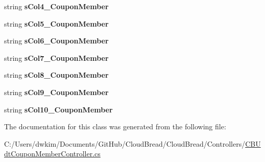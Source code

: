 \begin{DoxyCompactItemize}
\item 
string {\bfseries s\+Col4\+\_\+\+Coupon\+Member}\hypertarget{a00107_a351273da4a131cab3b9dfbbcc7a6a225}{}\label{a00107_a351273da4a131cab3b9dfbbcc7a6a225}

\item 
string {\bfseries s\+Col5\+\_\+\+Coupon\+Member}\hypertarget{a00107_a97416d9aeddf0f3162d7312692d5e01c}{}\label{a00107_a97416d9aeddf0f3162d7312692d5e01c}

\item 
string {\bfseries s\+Col6\+\_\+\+Coupon\+Member}\hypertarget{a00107_a26ceb53b70f63f0c74d13090583af721}{}\label{a00107_a26ceb53b70f63f0c74d13090583af721}

\item 
string {\bfseries s\+Col7\+\_\+\+Coupon\+Member}\hypertarget{a00107_ae48dd650ec26b7262732b32725ac7693}{}\label{a00107_ae48dd650ec26b7262732b32725ac7693}

\item 
string {\bfseries s\+Col8\+\_\+\+Coupon\+Member}\hypertarget{a00107_a9111a540c4b1e7627b9dc80be5a88a4a}{}\label{a00107_a9111a540c4b1e7627b9dc80be5a88a4a}

\item 
string {\bfseries s\+Col9\+\_\+\+Coupon\+Member}\hypertarget{a00107_ad13a3d8ed39954b877baf75cc5541d6b}{}\label{a00107_ad13a3d8ed39954b877baf75cc5541d6b}

\item 
string {\bfseries s\+Col10\+\_\+\+Coupon\+Member}\hypertarget{a00107_a823a5e85ddd16922ef1c24badf5381b8}{}\label{a00107_a823a5e85ddd16922ef1c24badf5381b8}

\end{DoxyCompactItemize}


The documentation for this class was generated from the following file\+:\begin{DoxyCompactItemize}
\item 
C\+:/\+Users/dwkim/\+Documents/\+Git\+Hub/\+Cloud\+Bread/\+Cloud\+Bread/\+Controllers/\hyperlink{a00228}{C\+B\+Udt\+Coupon\+Member\+Controller.\+cs}\end{DoxyCompactItemize}
